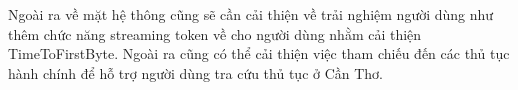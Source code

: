 \documentclass[a4paper, 12pt, openany]{book}
\begin{document}
Ngoài ra về mặt hệ thông cũng sẽ cần cải thiện về trải nghiệm người dùng như
thêm chức năng streaming token về cho người dùng nhằm cải thiện TimeToFirstByte. Ngoài ra cũng có thể cải thiện 
việc tham chiếu đến các thủ tục hành chính để hỗ trợ người dùng tra cứu thủ tục ở Cần Thơ.

\printbibliography
\end{document}
